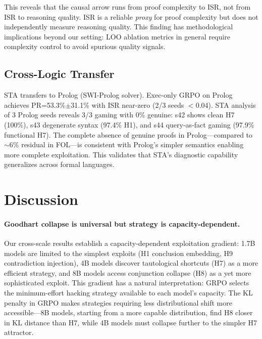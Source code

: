 \documentclass[11pt]{article}
\begin{document}
This reveals that the causal arrow runs from proof complexity to ISR, not from ISR to reasoning quality. ISR is a reliable \emph{proxy} for proof complexity but does not independently measure reasoning quality. This finding has methodological implications beyond our setting: LOO ablation metrics in general require complexity control to avoid spurious quality signals.

\subsection{Cross-Logic Transfer}

STA transfers to Prolog (SWI-Prolog solver). Exec-only GRPO on Prolog achieves PR=53.3\%$\pm$31.1\% with ISR near-zero (2/3 seeds $<$0.04). STA analysis of 3 Prolog seeds reveals 3/3 gaming with 0\% genuine: s42 shows clean H7 (100\%), s43 degenerate syntax (97.4\% H1), and s44 query-as-fact gaming (97.9\% functional H7). The complete absence of genuine proofs in Prolog---compared to $\sim$6\% residual in FOL---is consistent with Prolog's simpler semantics enabling more complete exploitation. This validates that STA's diagnostic capability generalizes across formal languages.

\section{Discussion}

\paragraph{Goodhart collapse is universal but strategy is capacity-dependent.} Our cross-scale results establish a capacity-dependent exploitation gradient: 1.7B models are limited to the simplest exploits (H1 conclusion embedding, H9 contradiction injection), 4B models discover tautological shortcuts (H7) as a more efficient strategy, and 8B models access conjunction collapse (H8) as a yet more sophisticated exploit. This gradient has a natural interpretation: GRPO selects the minimum-effort hacking strategy available to each model's capacity. The KL penalty in GRPO makes strategies requiring less distributional shift more accessible---8B models, starting from a more capable distribution, find H8 closer in KL distance than H7, while 4B models must collapse further to the simpler H7 attractor.
\end{document}
